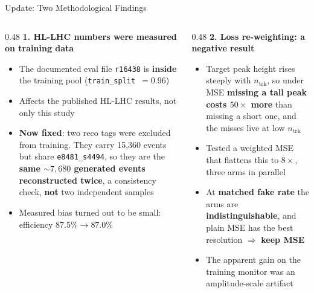 \documentclass[xcolor=table,aspectratio=169]{beamer}
\newcommand{\ntrk}{\ensuremath{n_\mathrm{trk}}}
\begin{document}
\begin{frame}{Update: Two Methodological Findings}
    \begin{columns}[T]
        \begin{column}{0.48\linewidth}
            \textbf{1. HL-LHC numbers were measured on training data}
            \vspace{0.3em}
            \begin{itemize}\footnotesize\setlength\itemsep{0.25em}
                \item The documented eval file \texttt{r16438} is \textbf{inside}
                      the training pool (\texttt{train\_split}~$=0.96$)
                \item Affects the published HL-LHC results, not only this study
                \item \textbf{Now fixed}: two reco tags were excluded from
                      training. They carry 15{,}360 events but share
                      \texttt{e8481\_s4494}, so they are the \textbf{same
                      ${\sim}7{,}680$ generated events reconstructed twice}, a
                      consistency check, \textbf{not} two independent samples
                \item Measured bias turned out to be small:
                      efficiency $87.5\%\rightarrow87.0\%$
            \end{itemize}
        \end{column}
        \begin{column}{0.48\linewidth}
            \textbf{2. Loss re-weighting: a negative result}
            \vspace{0.3em}
            \begin{itemize}\footnotesize\setlength\itemsep{0.25em}
                \item Target peak height rises steeply with \ntrk, so under MSE
                      \textbf{missing a tall peak costs $50\times$ more} than
                      missing a short one, and the misses live at low \ntrk
                \item Tested a weighted MSE that flattens this to $8\times$,
                      three arms in parallel
                \item At \textbf{matched fake rate} the arms are
                      \textbf{indistinguishable}, and plain MSE has the best
                      resolution $\Rightarrow$ \textbf{keep MSE}
                \item The apparent gain on the training monitor was an
                      amplitude-scale artifact
            \end{itemize}
        \end{column}
    \end{columns}
\end{frame}
\end{document}
